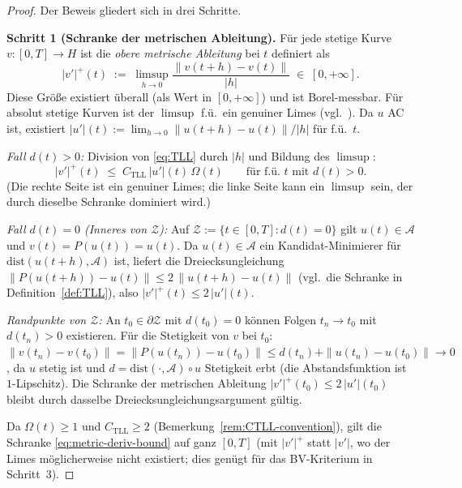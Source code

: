 \documentclass[12pt,a4paper]{article}
\theoremstyle{definition}
\theoremstyle{plain}
\theoremstyle{remark}
\newcommand{\dist}{\mathrm{dist}}
\begin{document}
\begin{proof}
Der Beweis gliedert sich in drei Schritte.

\medskip
\noindent
\textbf{Schritt 1 (Schranke der metrischen Ableitung).}\;
Für jede stetige Kurve $v: [0,T] \to H$ ist die \emph{obere
metrische Ableitung} bei $t$ definiert als
\[
  |v'|^+(t)
  \;:=\;
  \limsup_{h \to 0} \frac{\|v(t+h) - v(t)\|}{|h|}
  \;\in\; [0,+\infty].
\]
Diese Größe existiert überall (als Wert in $[0,+\infty]$)
und ist Borel-messbar.  Für absolut stetige Kurven ist der
$\limsup$ f.ü.\ ein genuiner Limes
(vgl.~\cite[Theorem~1.1.2]{AmbrosioGigliSavare2008}).
Da $u$ AC ist, existiert $|u'|(t) := \lim_{h\to 0}\|u(t+h)-u(t)\|/|h|$
für f.ü.~$t$.

\smallskip\noindent
\emph{Fall $d(t)>0$:}\;
Division von \eqref{eq:TLL} durch $|h|$ und Bildung des $\limsup$:
\begin{equation}\label{eq:metric-deriv-bound}
  |v'|^+(t)
  \;\le\;
  C_{\mathrm{TLL}}\,|u'|(t)\,\Omega(t)
  \qquad \text{für f.ü.\ } t \text{ mit } d(t) > 0.
\end{equation}
(Die rechte Seite ist ein genuiner Limes; die linke Seite kann
ein $\limsup$ sein, der durch dieselbe Schranke dominiert wird.)

\smallskip\noindent
\emph{Fall $d(t)=0$ (Inneres von $\mathcal{Z}$):}\;
Auf $\mathcal{Z} := \{t \in [0,T] : d(t) = 0\}$ gilt
$u(t) \in \mathcal{A}$ und $v(t) = P(u(t)) = u(t)$.
Da $u(t) \in \mathcal{A}$ ein Kandidat-Minimierer für
$\dist(u(t+h), \mathcal{A})$ ist, liefert die
Dreiecksungleichung
$\|P(u(t+h)) - u(t)\| \le 2\,\|u(t+h) - u(t)\|$
(vgl.\ die Schranke in Definition~\ref{def:TLL}),
also $|v'|^+(t) \le 2\,|u'|(t)$.

\smallskip\noindent
\emph{Randpunkte von $\mathcal{Z}$:}\;
An $t_0 \in \partial\mathcal{Z}$ mit $d(t_0)=0$ können Folgen
$t_n \to t_0$ mit $d(t_n) > 0$ existieren.  Für die Stetigkeit von
$v$ bei $t_0$: $\|v(t_n) - v(t_0)\| = \|P(u(t_n)) - u(t_0)\|
\le d(t_n) + \|u(t_n) - u(t_0)\| \to 0$, da $u$
stetig ist und $d = \dist(\cdot,\mathcal{A}) \circ u$ Stetigkeit
erbt (die Abstandsfunktion ist $1$-Lipschitz).  Die Schranke der metrischen Ableitung
$|v'|^+(t_0) \le 2\,|u'|(t_0)$ bleibt durch dasselbe
Dreiecksungleichungsargument gültig.

\smallskip\noindent
Da $\Omega(t) \ge 1$ und $C_{\mathrm{TLL}} \ge 2$
(Bemerkung~\ref{rem:CTLL-convention}), gilt die
Schranke \eqref{eq:metric-deriv-bound} auf ganz $[0,T]$
(mit $|v'|^+$ statt $|v'|$, wo der Limes möglicherweise
nicht existiert; dies genügt für das BV-Kriterium in Schritt~3).


\end{proof}
\end{document}
